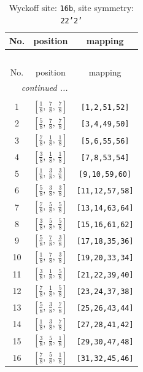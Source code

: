 \documentclass[fleqn,8pt]{jsarticle}
\begin{document}
\renewcommand{\arraystretch}{1.2}
\begin{longtable}{ccc}
\caption{Wyckoff site: {\tt 16b}, site symmetry: {\tt 22'2'}}
 \\
 \hline \hline
No. & position & mapping \\ \hline \endfirsthead

\multicolumn{2}{l}{\tablename\ \thetable{}} \\
 \hline \hline
No. & position & mapping \\ \hline \endhead

 \hline \hline
\multicolumn{2}{r}{\footnotesize\it continued ...} \\ \endfoot

 \hline \hline
\multicolumn{2}{r}{} \\ \endlastfoot

1 & $\left[ \frac{1}{8},\, \frac{7}{8},\, \frac{7}{8} \right]$ & {\tt [1,2,51,52]} \\ \hline
2 & $\left[ \frac{5}{8},\, \frac{7}{8},\, \frac{7}{8} \right]$ & {\tt [3,4,49,50]} \\ \hline
3 & $\left[ \frac{7}{8},\, \frac{1}{8},\, \frac{1}{8} \right]$ & {\tt [5,6,55,56]} \\ \hline
4 & $\left[ \frac{3}{8},\, \frac{1}{8},\, \frac{1}{8} \right]$ & {\tt [7,8,53,54]} \\ \hline
5 & $\left[ \frac{1}{8},\, \frac{3}{8},\, \frac{3}{8} \right]$ & {\tt [9,10,59,60]} \\ \hline
6 & $\left[ \frac{5}{8},\, \frac{3}{8},\, \frac{3}{8} \right]$ & {\tt [11,12,57,58]} \\ \hline
7 & $\left[ \frac{7}{8},\, \frac{5}{8},\, \frac{5}{8} \right]$ & {\tt [13,14,63,64]} \\ \hline
8 & $\left[ \frac{3}{8},\, \frac{5}{8},\, \frac{5}{8} \right]$ & {\tt [15,16,61,62]} \\ \hline
9 & $\left[ \frac{5}{8},\, \frac{7}{8},\, \frac{3}{8} \right]$ & {\tt [17,18,35,36]} \\ \hline
10 & $\left[ \frac{1}{8},\, \frac{7}{8},\, \frac{3}{8} \right]$ & {\tt [19,20,33,34]} \\ \hline
11 & $\left[ \frac{3}{8},\, \frac{1}{8},\, \frac{5}{8} \right]$ & {\tt [21,22,39,40]} \\ \hline
12 & $\left[ \frac{7}{8},\, \frac{1}{8},\, \frac{5}{8} \right]$ & {\tt [23,24,37,38]} \\ \hline
13 & $\left[ \frac{5}{8},\, \frac{3}{8},\, \frac{7}{8} \right]$ & {\tt [25,26,43,44]} \\ \hline
14 & $\left[ \frac{1}{8},\, \frac{3}{8},\, \frac{7}{8} \right]$ & {\tt [27,28,41,42]} \\ \hline
15 & $\left[ \frac{3}{8},\, \frac{5}{8},\, \frac{1}{8} \right]$ & {\tt [29,30,47,48]} \\ \hline
16 & $\left[ \frac{7}{8},\, \frac{5}{8},\, \frac{1}{8} \right]$ & {\tt [31,32,45,46]} \\
\end{longtable}
\end{document}
